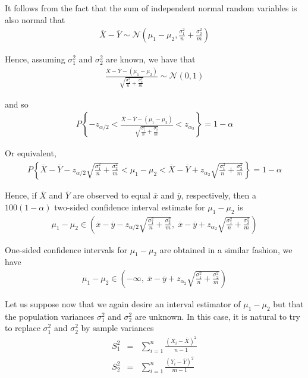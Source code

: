 \documentclass[12pt]{article}
\begin{document}
It follows from the fact that the sum of independent normal random variables is also normal that
\begin{eqnarray*}
  \overline{X} - \overline{Y} \sim \mathcal{N} (\mu_1 - \mu_2,
  \frac{\sigma_1^2}{n} + \frac{\sigma_2^2}{m})
\end{eqnarray*}

Hence, assuming $\sigma_1^2$ and $\sigma_2^2$ are known, we have that
\begin{eqnarray*}
  \frac {\overline{X} - \overline{Y} - (\mu_1 - \mu_2)}
  {\sqrt {\frac{\sigma_1^2}{n} + \frac{\sigma_2^2}{m}}}
  \sim \mathcal{N} (0,1)
\end{eqnarray*}

and so
\begin{eqnarray*}
  P \left\{ -z_{\alpha/2} <
      \frac {\overline{X} - \overline{Y} - (\mu_1 - \mu_2)}
      {\sqrt {\frac{\sigma_1^2}{n} + \frac{\sigma_2^2}{m}}}
      < z_{\alpha_2} \right\} = 1 - \alpha
\end{eqnarray*}

Or equivalent,
\begin{eqnarray*}
  P \left\{ \overline{X} - \overline{Y}
    - z_{\alpha/2} \sqrt {\frac{\sigma_1^2}{n} + \frac{\sigma_2^2}{m}}
    < \mu_1 - \mu_2
    < \overline{X} - \overline{Y}
      + z_{\alpha_2} \sqrt {\frac{\sigma_1^2}{n} + \frac{\sigma_2^2}{m}}
    \right\} = 1 - \alpha
\end{eqnarray*}

Hence, if $\overline{X}$ and $\overline{Y}$ are observed to equal $\overline{x}$ and $\overline{y}$, respectively, then a $100(1 - \alpha)$ two-sided confidence interval estimate for $\mu_1 - \mu_2$ is
\begin{eqnarray*}
  \mu_1 - \mu_2 \in
  \left( \overline{x} - \overline{y}
    - z_{\alpha/2} \sqrt {\frac{\sigma_1^2}{n} + \frac{\sigma_2^2}{m}}, \;
    \overline{x} - \overline{y}
      + z_{\alpha_2} \sqrt {\frac{\sigma_1^2}{n} + \frac{\sigma_2^2}{m}}
    \right)
\end{eqnarray*}

One-sided confidence intervals for $\mu_1 - \mu_2$ are obtained in a similar fashion, we have
\begin{eqnarray*}
  \mu_1 - \mu_2 \in
  \left( - \infty, \; \overline{x} - \overline{y}
      + z_{\alpha_2} \sqrt {\frac{\sigma_1^2}{n} + \frac{\sigma_2^2}{m}}
    \right)
\end{eqnarray*}

Let us suppose now that we again desire an interval estimator of $\mu_1 - \mu_2$ but that the population variances $\sigma_1^2$ and $\sigma_2^2$ are unknown. In this case, it is natural to try to replace $\sigma_1^2$ and $\sigma_2^2$ by sample variances
\begin{eqnarray*}
  S_1^2 &=& \sum_{i=1}^n \frac {(X_i - \overline{X})^2}{n-1} \\
  S_2^2 &=& \sum_{i=1}^n \frac {(Y_i - \overline{Y})^2}{m-1}
\end{eqnarray*}
\end{document}
